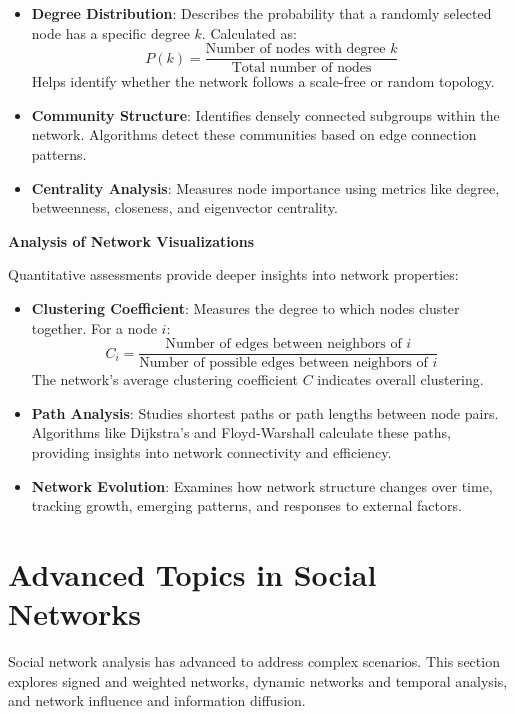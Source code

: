 \documentclass[12pt]{book} %
\begin{document}
\begin{itemize}
    \item \textbf{Degree Distribution}: Describes the probability that a randomly selected node has a specific degree \(k\). Calculated as:
    \[ P(k) = \frac{\text{Number of nodes with degree } k}{\text{Total number of nodes}} \]
    Helps identify whether the network follows a scale-free or random topology.

    \item \textbf{Community Structure}: Identifies densely connected subgroups within the network. Algorithms detect these communities based on edge connection patterns.

    \item \textbf{Centrality Analysis}: Measures node importance using metrics like degree, betweenness, closeness, and eigenvector centrality.
\end{itemize}

\textbf{Analysis of Network Visualizations}

Quantitative assessments provide deeper insights into network properties:

\begin{itemize}
    \item \textbf{Clustering Coefficient}: Measures the degree to which nodes cluster together. For a node \(i\):
    \[ C_i = \frac{\text{Number of edges between neighbors of } i}{\text{Number of possible edges between neighbors of } i} \]
    The network's average clustering coefficient \(C\) indicates overall clustering.

    \item \textbf{Path Analysis}: Studies shortest paths or path lengths between node pairs. Algorithms like Dijkstra's and Floyd-Warshall calculate these paths, providing insights into network connectivity and efficiency.

    \item \textbf{Network Evolution}: Examines how network structure changes over time, tracking growth, emerging patterns, and responses to external factors.
\end{itemize}

\section{Advanced Topics in Social Networks}

Social network analysis has advanced to address complex scenarios. This section explores signed and weighted networks, dynamic networks and temporal analysis, and network influence and information diffusion.
\end{document}
